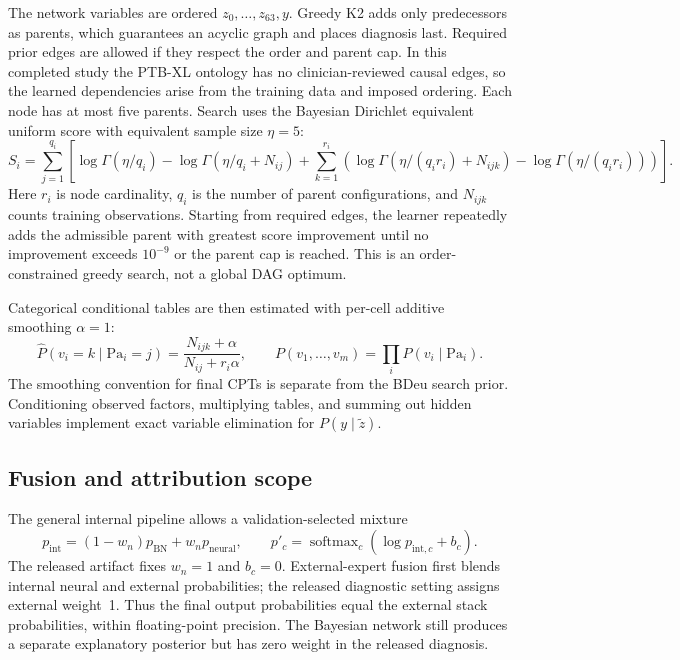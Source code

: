 \documentclass[11pt,a4paper]{article}
\begin{document}
The network variables are ordered $z_0,\ldots,z_{63},y$. Greedy K2 adds only predecessors as parents, which guarantees an acyclic graph and places diagnosis last. Required prior edges are allowed if they respect the order and parent cap. In this completed study the PTB-XL ontology has no clinician-reviewed causal edges, so the learned dependencies arise from the training data and imposed ordering. Each node has at most five parents. Search uses the Bayesian Dirichlet equivalent uniform score with equivalent sample size $\eta=5$:
\begin{equation}
S_i=\sum_{j=1}^{q_i}\left[\log\Gamma(\eta/q_i)-\log\Gamma(\eta/q_i+N_{ij})+
\sum_{k=1}^{r_i}\left(\log\Gamma(\eta/(q_ir_i)+N_{ijk})-\log\Gamma(\eta/(q_ir_i))\right)\right].
\end{equation}
Here $r_i$ is node cardinality, $q_i$ is the number of parent configurations, and $N_{ijk}$ counts training observations. Starting from required edges, the learner repeatedly adds the admissible parent with greatest score improvement until no improvement exceeds $10^{-9}$ or the parent cap is reached. This is an order-constrained greedy search, not a global DAG optimum.

Categorical conditional tables are then estimated with per-cell additive smoothing $\alpha=1$:
\begin{equation}
\widehat{P}(v_i=k\mid\mathrm{Pa}_i=j)=\frac{N_{ijk}+\alpha}{N_{ij}+r_i\alpha},\qquad
P(v_1,\ldots,v_m)=\prod_i P(v_i\mid\mathrm{Pa}_i).
\end{equation}
The smoothing convention for final CPTs is separate from the BDeu search prior. Conditioning observed factors, multiplying tables, and summing out hidden variables implement exact variable elimination for $P(y\mid\tilde z)$.

\subsection{Fusion and attribution scope}
The general internal pipeline allows a validation-selected mixture
\begin{equation}
p_{\mathrm{int}}=(1-w_n)p_{\mathrm{BN}}+w_n p_{\mathrm{neural}},\qquad
p'_{c}=\operatorname{softmax}_c(\log p_{\mathrm{int},c}+b_c).
\end{equation}
The released artifact fixes $w_n=1$ and $b_c=0$. External-expert fusion first blends internal neural and external probabilities; the released diagnostic setting assigns external weight~1. Thus the final output probabilities equal the external stack probabilities, within floating-point precision. The Bayesian network still produces a separate explanatory posterior but has zero weight in the released diagnosis.
\end{document}
